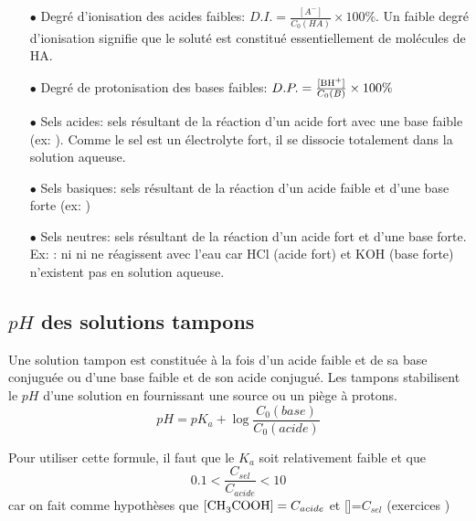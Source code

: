 \documentclass[11pt,a4paper,french]{article}
\newcommand\ph{\ensuremath{pH}}
\begin{document}
\begin{itemize}
\item[$\bullet$] Degré d'ionisation des acides faibles: $D.I.=\frac{[A^{-}]}{C_0(HA)}\times 100\%$.
	Un faible degré d'ionisation signifie que le soluté est constitué essentiellement de molécules de HA.

\item[$\bullet$] Degré de protonisation des bases faibles: $D.P.=\frac{[\ce{BH+}]}{C_0(B)}\times 100\%$

\item[$\bullet$] Sels acides: sels résultant de la réaction d'un acide fort avec une base faible (ex: ).
	Comme le sel est un électrolyte fort, il se dissocie totalement dans la solution aqueuse.

\item[$\bullet$] Sels basiques: sels résultant de la réaction d'un acide faible et d'une base forte (ex: )

\item[$\bullet$] Sels neutres: sels résultant de la réaction d'un acide fort et d'une base forte.
	Ex: : ni  ni  ne réagissent avec l'eau car HCl (acide fort) et KOH (base forte) n'existent pas en solution aqueuse.
\end{itemize}

\subsection{$\ph$ des solutions tampons}
Une solution tampon est constituée à la fois d'un acide faible et de sa base conjuguée ou d'une base faible et de son acide conjugué.
Les tampons stabilisent le $\ph$ d'une solution en fournissant une source ou un piège à protons.
$$\ph = pK_a + \log{\frac{C_0(base)}{C_0(acide)}}$$

Pour utiliser cette formule, il faut que le $K_a$ soit relativement faible et que
$$0.1<\frac{C_{sel}}{C_{acide}}<10$$
car on fait comme hypothèses que $\ce{[CH3COOH]}=C_{acide}$ et []=$C_{sel}$
(exercices \cite[p.~38]{godard})
\end{document}
